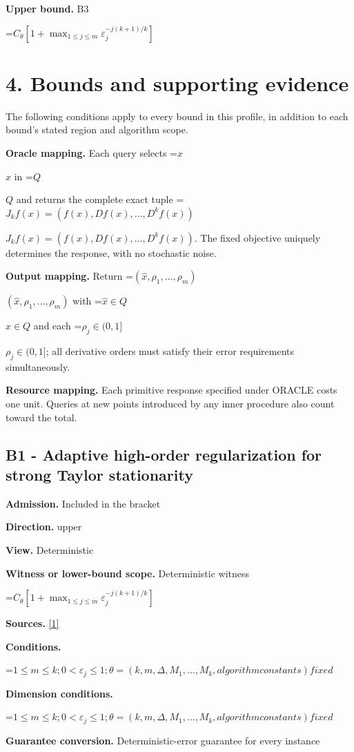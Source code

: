 \documentclass[10pt,a4paper]{article}
\newcommand{\AtlasMath}[1]{\par\begingroup\centering\setbox0=\hbox{$\displaystyle #1$}\ifdim\wd0>1.4\linewidth\typeout{ATLAS WIDE FORMULA: \the\wd0}\fi\ifdim\wd0>\linewidth\resizebox{\linewidth}{!}{\box0}\else\box0\fi\par\endgroup}
\newcommand{\AtlasInlineMath}[1]{\begingroup\setbox0=\hbox{$#1$}\ifdim\wd0>.4\linewidth\endgroup\AtlasMath{#1}\else\endgroup$#1$\fi}
\begin{document}
\textbf{Upper bound.} B3

\AtlasMath{C_\theta[1+\max_{1\le j\le m}\varepsilon_j^{-j(k+1)/k}]}
\section{4. Bounds and supporting evidence}
The following conditions apply to every bound in this profile, in addition to each bound's stated region and algorithm scope.

\textbf{Oracle mapping.} Each query selects \AtlasInlineMath{x} in \AtlasInlineMath{Q} and returns the complete exact tuple \AtlasInlineMath{J_{k}f(x)=(f(x),Df(x),\ldots,D^{k}f(x))}. The fixed objective uniquely determines the response, with no stochastic noise.

\textbf{Output mapping.} Return \AtlasInlineMath{(\widehat{x},\rho_1,\ldots,\rho_m)} with \AtlasInlineMath{\widehat{x}\in Q} and each \AtlasInlineMath{\rho_j\in(0,1]}; all derivative orders must satisfy their error requirements simultaneously.

\textbf{Resource mapping.} Each primitive response specified under ORACLE costs one unit. Queries at new points introduced by any inner procedure also count toward the total.

\subsection{B1 - Adaptive high-order regularization for strong Taylor stationarity}
\textbf{Admission.} Included in the bracket

\textbf{Direction.} upper

\textbf{View.} Deterministic

\textbf{Witness or lower-bound scope.} Deterministic witness

\AtlasMath{C_\theta[1+\max_{1\le j\le m}\varepsilon_j^{-j(k+1)/k}]}
\textbf{Sources.} \href{https://optimization-online.org/wp-content/uploads/2020/01/7590.pdf}{[1]}

\textbf{Conditions.} 
\AtlasMath{1\le m\le k;0<\varepsilon_j\le 1;\theta=(k,m,\Delta,M_1,\ldots,M_k,algorithm constants) fixed}


\textbf{Dimension conditions.} 
\AtlasMath{1\le m\le k;0<\varepsilon_j\le 1;\theta=(k,m,\Delta,M_1,\ldots,M_k,algorithm constants) fixed}


\textbf{Guarantee conversion.} Deterministic-error guarantee for every instance
\end{document}
